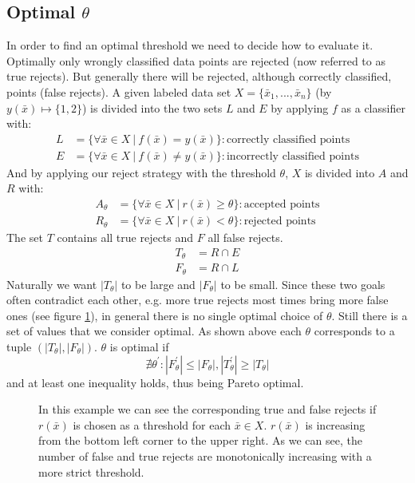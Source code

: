 \subsection{Optimal $\theta$}
\label{optimalt}
In order to find an optimal threshold we need to decide how to evaluate it. Optimally only wrongly classified data points are rejected (now referred to as true rejects). But generally there will be rejected, although correctly classified, points (false rejects). 
A given labeled data set $X = \{\bar{x}_1,...,\bar{x}_n\}$ (by $y(\bar{x}) \mapsto \{1,2\}$) is divided into the two sets $L$ and $E$ by applying $f$ as a classifier with:
\begin{align} 
L&=\{\forall \bar{x} \in X \ | \ f(\bar{x}) = y(\bar{x})\} : \text{correctly classified points} \\
E&=\{\forall \bar{x} \in X \ | \ f(\bar{x}) \neq y(\bar{x})\} : \text{incorrectly classified points} 
\end{align}
And by applying our reject strategy with the threshold $\theta$, $X$ is divided into $A$ and $R$ with:
\begin{align} 
A_\theta&=\{\forall \bar{x} \in X \ | \ r(\bar{x}) \geq \theta \} : \text{accepted points} \\
R_\theta&=\{\forall \bar{x} \in X \ | \ r(\bar{x}) < \theta\} : \text{rejected points} 
\end{align}
The set $T$ contains all true rejects and $F$ all false rejects.
\begin{align} 
T_\theta &= R \cap E \\ 
F_\theta &= R \cap L
\end{align}
Naturally we want $|T_\theta|$ to be large and $|F_\theta|$ to be small. Since these two goals often contradict each other, e.g. more true rejects most times bring more false ones (see figure \ref{incTaF}), in general there is no single optimal choice of $\theta$. Still there is a set of values that we consider optimal. As shown above each $\theta$ corresponds to a tuple $(|T_\theta|,|F_\theta|)$. $\theta$ is optimal if
$$ \nexists \theta^{'} : |F_\theta^{'}|\leq|F_\theta|, |T_\theta^{'}|\geq|T_\theta| $$ and at least one inequality holds, thus being Pareto optimal.

\begin{figure}[!htbp]
\centering
\caption{In this example we can see the corresponding true and false rejects if $r(\bar{x})$ is chosen as a threshold for each $\bar{x} \in X$. $r(\bar{x})$ is increasing from the bottom left corner to the upper right. As we can see, the number of false and true rejects are monotonically increasing with a more strict threshold.}
\label{incTaF}
\end{figure}

